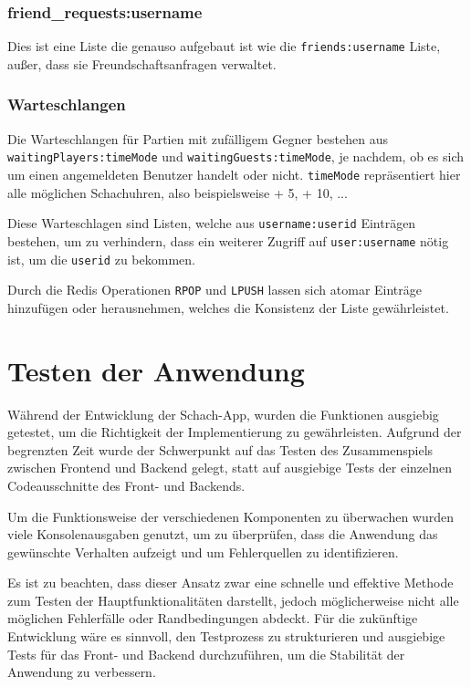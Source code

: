 \subsubsection{friend\_requests:username}
Dies ist eine Liste die genauso aufgebaut ist wie die \verb|friends:username| Liste, außer, dass sie Freundschaftsanfragen verwaltet.

\subsubsection{Warteschlangen}
\label{sec:Warteschlange}
Die Warteschlangen für Partien mit zufälligem Gegner bestehen aus \linebreak \verb|waitingPlayers:timeMode| und \verb|waitingGuests:timeMode|, je nachdem, ob es sich um einen angemeldeten Benutzer handelt oder nicht. \verb|timeMode| repräsentiert hier alle möglichen Schachuhren, also beispielsweise  + 5\grqq ,  + 10\grqq , ...

Diese Warteschlagen sind Listen, welche aus \verb|username:userid| Einträgen bestehen, um zu verhindern, dass ein weiterer Zugriff auf \verb|user:username| nötig ist, um die \verb|userid| zu bekommen. 

Durch die Redis Operationen \verb|RPOP| und \verb|LPUSH| lassen sich atomar Einträge hinzufügen oder herausnehmen, welches die Konsistenz der Liste gewährleistet.

\section{Testen der Anwendung}
Während der Entwicklung der Schach-App, wurden die Funktionen ausgiebig getestet, um die Richtigkeit der Implementierung zu gewährleisten. Aufgrund der begrenzten Zeit wurde der Schwerpunkt auf das Testen des Zusammenspiels zwischen Frontend und Backend gelegt, statt auf ausgiebige Tests der einzelnen Codeausschnitte des Front- und Backends.

Um die Funktionsweise der verschiedenen Komponenten zu überwachen wurden viele Konsolenausgaben genutzt, um zu überprüfen, dass die Anwendung das gewünschte Verhalten aufzeigt und um Fehlerquellen zu identifizieren.

Es ist zu beachten, dass dieser Ansatz zwar eine schnelle und effektive Methode zum Testen der Hauptfunktionalitäten darstellt, jedoch möglicherweise nicht alle möglichen Fehlerfälle oder Randbedingungen abdeckt. Für die zukünftige Entwicklung wäre es sinnvoll, den Testprozess zu strukturieren und ausgiebige Tests für das Front- und Backend durchzuführen, um die Stabilität der Anwendung zu verbessern.
